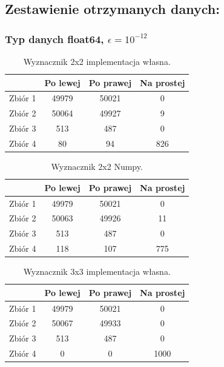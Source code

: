 \documentclass[11pt]{scrartcl}
\begin{document}
    \subsection{Zestawienie otrzymanych danych:}
    \subsubsection{Typ danych float64, $\epsilon=10^{-12}$}

    \begin{table}[H]
        \centering
        \renewcommand{\arraystretch}{1.5}
        \begin{tabular}{| c | c | c | c |}
            \hline
            & Po lewej & Po prawej & Na prostej \\
            \hline
            Zbiór 1 & 49979 & 50021 & 0 \\
            \hline
            Zbiór 2 & 50064 & 49927 & 9 \\
            \hline
            Zbiór 3 & 513 & 487 & 0 \\
            \hline
            Zbiór 4 & 80 & 94 & 826 \\
            \hline
        \end{tabular}
        \renewcommand{\arraystretch}{1.5}
        \caption{Wyznacznik 2x2 implementacja własna.}
    \end{table}
    \begin{table}[H]
        \centering
        \renewcommand{\arraystretch}{1.5}
        \begin{tabular}{| c | c | c | c |}
            \hline
            & Po lewej & Po prawej & Na prostej \\
            \hline
            Zbiór 1 & 49979 & 50021 & 0 \\
            \hline
            Zbiór 2 & 50063 & 49926 & 11 \\
            \hline
            Zbiór 3 & 513 & 487 & 0 \\
            \hline
            Zbiór 4 & 118 & 107 & 775 \\
            \hline
        \end{tabular}
        \renewcommand{\arraystretch}{1.5}
        \caption{Wyznacznik 2x2 Numpy.}
    \end{table}
    \begin{table}[H]
        \centering
        \renewcommand{\arraystretch}{1.5}
        \begin{tabular}{| c | c | c | c |}
            \hline
            & Po lewej & Po prawej & Na prostej \\
            \hline
            Zbiór 1 & 49979 & 50021 & 0 \\
            \hline
            Zbiór 2 & 50067 & 49933 & 0 \\
            \hline
            Zbiór 3 & 513 & 487 & 0 \\
            \hline
            Zbiór 4 & 0 & 0 & 1000 \\
            \hline
        \end{tabular}
        \renewcommand{\arraystretch}{1.5}
        \caption{Wyznacznik 3x3 implementacja własna.}
    \end{table}
\end{document}

